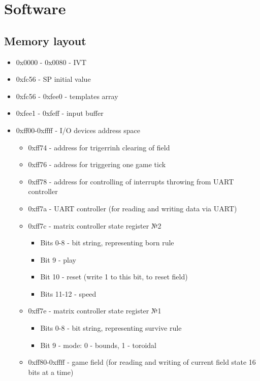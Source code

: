 \chapter*{Software}

\section*{Memory layout}

\begin{itemize}
	\item 0x0000 - 0x0080 - IVT
	\item 0xfc56 - SP initial value
	\item 0xfc56 - 0xfee0 - templates array 
	\item 0xfee1 - 0xfeff - input buffer 
	\item 0xff00-0xffff - I/O devices address space \begin{itemize}
		\item 0xff74 - address for trigerrinh clearing of field
		\item 0xff76 - address for triggering one game tick
		\item 0xff78 - address for controlling of interrupts throwing from UART controller
		\item 0xff7a - UART controller (for reading and writing data via UART) 
		\item 0xff7c - matrix controller state register №2 \begin{itemize}
				\item Bits 0-8 - bit string, representing born rule
				\item Bit 9 - play
				\item Bit 10 - reset (write 1 to this bit, to reset field)
				\item Bits 11-12 - speed
		\end{itemize}
		\item 0xff7e - matrix controller state register №1 \begin{itemize}
				\item Bits 0-8 - bit string, representing survive rule
				\item Bit 9 - mode: 0 - bounds, 1 - toroidal
		\end{itemize}
		\item 0xff80-0xffff - game field (for reading and writing of current field state 16 bits at a time) 
	\end{itemize}
\end{itemize}

